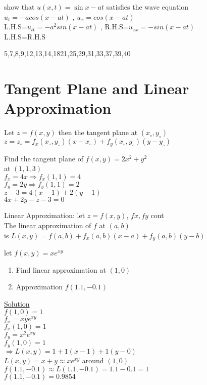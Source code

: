     \begin{example}
    show that $u(x,t)=\sin{x-at}$ satisfies the wave equation \\
    $u_t=-acos(x-at)$ , $u_x=cos(x-at)$\\
    L.H.S=$u_{tt}=-a^2sin(x-at)$ , R.H.S=$u_{xx}=-sin(x-at)$\\
    L.H.S=R.H.S
    \end{example}
\noindent{\color{smalt(darkpowderblue)}\rule{\linewidth}{.2mm}}
\begin{problem}
5,7,8,9,12,13,14,1821,25,29,31,33,37,39,40
\end{problem}
\section{Tangent Plane and Linear Approximation}
Let $z=f(x,y)$ then the tangent plane at $(x_\circ,y_\circ)$\\
$z=z_\circ=f_x(x_\circ,y_\circ)(x-x_\circ)+f_y(x_\circ,y_\circ)(y-y_\circ)$\\
\noindent{\color{smalt(darkpowderblue)}\rule{\linewidth}{.2mm}}

\begin{example}
Find the tangent plane of $f(x,y)=2x^2+y^2$\\
at $(1,1,3)$\\
$f_x=4x\Rightarrow f_x(1,1)=4$\\
$f_y=2y\Rightarrow f_y(1,1)=2$\\
$z-3=4(x-1)+2(y-1)$\\
$4x+2y-z-3=0$
\end{example}
\noindent{\color{smalt(darkpowderblue)}\rule{\linewidth}{.2mm}}
Linear Approximation: let $z=f(x,y)$, $fx,fy$ cont\\
The linear approximation of $f$ at $(a,b)$\\
is $L(x,y)=f(a,b)+f_x(a,b)(x-a)+f_y(a,b)(y-b)$\\
\noindent{\color{smalt(darkpowderblue)}\rule{\linewidth}{.2mm}}

\begin{example}
let $f(x,y)=x e^{x y}$
\begin{enumerate}
    \item Find linear approximation at $(1,0)$ 
    \item Approximation $f(1.1,-0.1)$\\
\end{enumerate}
\underline{\textbf{\large}\color{smalt(darkpowderblue)}Solution}\\
$f(1,0)=1$\\
$f_x=xye^{xy}$\\
$f_x(1,0)=1$\\
$f_y=x^2e^{xy}$\\
$f_y(1,0)=1$\\
$\Rightarrow L(x,y)=1+1(x-1)+1(y-0)$\\
$L(x,y)=x+y\approx xe^{xy}$ around $(1,0)$\\
$f(1.1,-0.1)\approx L(1.1,-0.1)=1.1-0.1=1$\\
$f(1.1,-0.1)=0.9854$
\end{example}
\noindent{\color{smalt(darkpowderblue)}\rule{\linewidth}{.2mm}}

